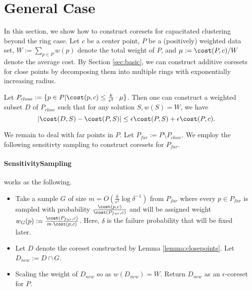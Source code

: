 \section{General Case}

In this section, we show how to construct coresets for capacitated clustering beyond the ring case. Let $c$ be a center point, $P$ be a (positively) weighted data set,  $W:=\sum_{p\in P} w(p)$ denote the total weight of $P$, and $\mu:=\cost(P,c)/W$ denote the average cost. By Section \ref{sec:basic}, we can construct additive coresets for close points by decomposing them into multiple rings with exponentially increasing radius.

\begin{lemma} \label{lemma:closepoints}
Let $P_{close}:=\{p\in P| \cost(p,c)\leq \frac{k}{\epsilon^2}\cdot \mu\}$. Then one can construct a weighted subset $D$ of $P_{close} $ such that for any solution $S, w(S)=W$, we have
$$
|\cost(D,S)-\cost(P,S)|\leq \epsilon \cost(P,S)+\epsilon\cost(P,c).
$$
\end{lemma}

We remain to deal with far points in $P$. Let $P_{far}:=P\setminus P_{close}$. We employ the following sensitivty sampling to construct coresets for $P_{far}$.

\paragraph{SensitivitySampling} works as the following. 

\begin{itemize}
\item Take a sample $G$ of size $m=O(\frac{k}{\epsilon^3}\log \delta^{-1})$ from $P_{far}$ where every $p\in P_{far}$ is sampled with probability $\frac{\cost(p,c)}{\cost(P_{far},c)}$ and will be assigned weight $w_G(p):=\frac{\cost(P_{far},c)}{m\cdot \cost(p,c)}$. Here, $\delta$ is the failure probability that will be fixed later.
\item Let $D$ denote the coreset constructed by Lemma \ref{lemma:closepoints}. Let $D_{new}:=D\cap G$.
\item Scaling the weight of $D_{new}$ so as $w(D_{new})=W$. Return $D_{new}$ as an $\epsilon$-coreset for $P$.
\end{itemize}

